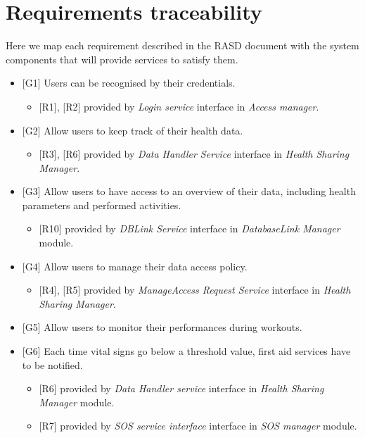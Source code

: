 \documentclass[DD.tex]{subfiles}
\begin{document}
\section{Requirements traceability}
Here we map each requirement described in the RASD document with the system components that will provide services to satisfy them.

\begin{itemize}	

	\item {[G1]} Users can be recognised by their credentials.
	\begin{itemize}
		\item {[R1]}, {[R2]} provided by \textit{Login service} interface in \textit{Access manager}.
	\end{itemize} 

	\item {[G2]} Allow users to keep track of their health data.	
	\begin{itemize}
		\item {[R3]}, {[R6]} provided by \textit{Data Handler Service} interface in \textit{Health Sharing Manager}. 
	\end{itemize}
	
	\item {[G3]} Allow users to have access to an overview of their 
	data, including health parameters and performed activities.
	\begin{itemize}
		\item {[R10]} provided by \textit{DBLink Service} interface in \textit{DatabaseLink Manager} module.
	\end{itemize}
	
	\item {[G4]} Allow users to manage their data access policy.
	\begin{itemize}
		\item {[R4]}, {[R5]} provided by \textit{ManageAccess Request Service} interface in \textit{Health Sharing Manager}.
	\end{itemize}
	
	\item {[G5]} Allow users to monitor their performances during 
	workouts.

	
	\item {[G6]} Each time vital signs go below a threshold value, first 
	aid services have to be notified.
	\begin{itemize}
		\item {[R6]} provided by \textit{Data Handler service} interface in \textit{Health Sharing Manager} module.
		\item {[R7]} provided by \textit{SOS service interface} interface in \textit{SOS manager} module. 
	\end{itemize}
		

\end{itemize}
\end{document}
